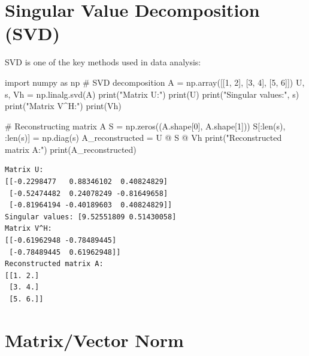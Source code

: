 \documentclass[
  english,
  letterpaper,
  DIV=11,
  numbers=noendperiod]{scrreprt}
\newenvironment{Shaded}{\begin{snugshade}}{\end{snugshade}}
\newcommand{\BuiltInTok}[1]{\textcolor[rgb]{0.00,0.23,0.31}{#1}}
\newcommand{\CommentTok}[1]{\textcolor[rgb]{0.37,0.37,0.37}{#1}}
\newcommand{\DecValTok}[1]{\textcolor[rgb]{0.68,0.00,0.00}{#1}}
\newcommand{\ImportTok}[1]{\textcolor[rgb]{0.00,0.46,0.62}{#1}}
\newcommand{\NormalTok}[1]{\textcolor[rgb]{0.00,0.23,0.31}{#1}}
\newcommand{\OperatorTok}[1]{\textcolor[rgb]{0.37,0.37,0.37}{#1}}
\newcommand{\StringTok}[1]{\textcolor[rgb]{0.13,0.47,0.30}{#1}}
\begin{document}
\section{Singular Value Decomposition
(SVD)}\label{singular-value-decomposition-svd}

SVD is one of the key methods used in data analysis:

\begin{Shaded}
\begin{Highlighting}[]
\ImportTok{import}\NormalTok{ numpy }\ImportTok{as}\NormalTok{ np}
\CommentTok{\# SVD decomposition}
\NormalTok{A }\OperatorTok{=}\NormalTok{ np.array([[}\DecValTok{1}\NormalTok{, }\DecValTok{2}\NormalTok{], [}\DecValTok{3}\NormalTok{, }\DecValTok{4}\NormalTok{], [}\DecValTok{5}\NormalTok{, }\DecValTok{6}\NormalTok{]])}
\NormalTok{U, s, Vh }\OperatorTok{=}\NormalTok{ np.linalg.svd(A)}
\BuiltInTok{print}\NormalTok{(}\StringTok{"Matrix U:"}\NormalTok{)}
\BuiltInTok{print}\NormalTok{(U)}
\BuiltInTok{print}\NormalTok{(}\StringTok{"Singular values:"}\NormalTok{, s)}
\BuiltInTok{print}\NormalTok{(}\StringTok{"Matrix V\^{}H:"}\NormalTok{)}
\BuiltInTok{print}\NormalTok{(Vh)}

\CommentTok{\# Reconstructing matrix A}
\NormalTok{S }\OperatorTok{=}\NormalTok{ np.zeros((A.shape[}\DecValTok{0}\NormalTok{], A.shape[}\DecValTok{1}\NormalTok{]))}
\NormalTok{S[:}\BuiltInTok{len}\NormalTok{(s), :}\BuiltInTok{len}\NormalTok{(s)] }\OperatorTok{=}\NormalTok{ np.diag(s)}
\NormalTok{A\_reconstructed }\OperatorTok{=}\NormalTok{ U }\OperatorTok{@}\NormalTok{ S }\OperatorTok{@}\NormalTok{ Vh}
\BuiltInTok{print}\NormalTok{(}\StringTok{"Reconstructed matrix A:"}\NormalTok{)}
\BuiltInTok{print}\NormalTok{(A\_reconstructed)}
\end{Highlighting}
\end{Shaded}

\begin{verbatim}
Matrix U:
[[-0.2298477   0.88346102  0.40824829]
 [-0.52474482  0.24078249 -0.81649658]
 [-0.81964194 -0.40189603  0.40824829]]
Singular values: [9.52551809 0.51430058]
Matrix V^H:
[[-0.61962948 -0.78489445]
 [-0.78489445  0.61962948]]
Reconstructed matrix A:
[[1. 2.]
 [3. 4.]
 [5. 6.]]
\end{verbatim}

\section{Matrix/Vector Norm}\label{matrixvector-norm}
\end{document}
